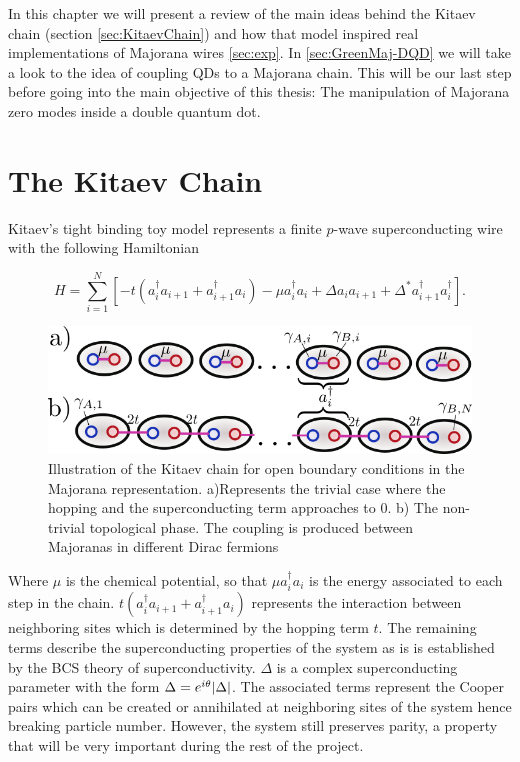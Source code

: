In this chapter we will present a review of the main ideas behind the Kitaev chain (section \ref{sec:KitaevChain}) and how that model inspired real implementations of Majorana wires \ref{sec:exp}.  In \ref{sec:GreenMaj-DQD} we will take a look to the idea of coupling QDs to a Majorana chain. This will be our last step before going into the main objective of this thesis: The manipulation of Majorana zero modes inside a double quantum dot. 






\section{The Kitaev Chain \label{sec:KitaevChain}}

Kitaev's tight binding toy model  represents a  finite $p$-wave superconducting wire with the following Hamiltonian

\begin{equation}
H = \sum_{i=1}^N \left[ -t(a_i^{\dagger} a_{i+1} + a_{i+1}^{\dagger}a_i) -\mu a_i^{\dagger} a_{i} +  \Delta a_{i}a_{i+1} + \Delta^* a_{i+1}^{\dagger}a_i^{\dagger} \right].  \label{eq:kitaevHam}
\end{equation}

\begin{figure}[t]
    \centering
    \includegraphics[scale=0.5]{IMAGES/Majorana/KitaevChain.png}
    
    \caption{ \label{fig:top.phases kitaev} Illustration of the Kitaev chain for open boundary conditions in the Majorana representation. a)Represents the trivial case where the hopping and the superconducting term approaches to $0$. b) The non-trivial topological phase. The coupling is produced between Majoranas in different Dirac fermions \protect{} }
\end{figure}

Where $\mu$ is the chemical potential, so that $\mu a_i^{\dagger} a_{i}$ is the energy associated to each step in the chain. $t(a_i^{\dagger} a_{i+1} + a_{i+1}^{\dagger}a_i)$ represents the interaction between neighboring sites which is determined by the hopping term $t$. The remaining terms describe the superconducting properties of the system as is is established by the BCS theory of superconductivity. $\Delta$ is a complex superconducting parameter with the form  $\Delta = e^{i\theta} \vert \Delta \vert$. The associated terms represent the Cooper pairs which can be created or annihilated at neighboring sites of the system hence breaking particle number. However, the system still preserves parity, a property that will be very important during the rest of the project. 

